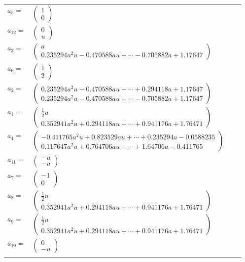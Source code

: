 \documentclass[1p]{elsarticle_modified}
\theoremstyle{definition}
\begin{document}
\begin{tabular}{m{7pt} m{180pt} m{7pt} m{180pt} }
\flushright $a_{5}=$&$\begin{pmatrix}1\\0\end{pmatrix}$ \\
\flushright $a_{12}=$&$\begin{pmatrix}0\\u\end{pmatrix}$ \\
\flushright $a_{3}=$&$\begin{pmatrix}a\\0.235294 a^{2} u-0.470588 a u+\cdots-0.705882 a+1.17647\end{pmatrix}$ \\
\flushright $a_{6}=$&$\begin{pmatrix}1\\2\end{pmatrix}$ \\
\flushright $a_{2}=$&$\begin{pmatrix}0.235294 a^{2} u-0.470588 a u+\cdots+0.294118 a+1.17647\\0.235294 a^{2} u-0.470588 a u+\cdots-0.705882 a+1.17647\end{pmatrix}$ \\
\flushright $a_{1}=$&$\begin{pmatrix}\frac{1}{2} u\\0.352941 a^{2} u+0.294118 a u+\cdots+0.941176 a+1.76471\end{pmatrix}$ \\
\flushright $a_{4}=$&$\begin{pmatrix}-0.411765 a^{2} u+0.823529 a u+\cdots+0.235294 a-0.0588235\\0.117647 a^{2} u+0.764706 a u+\cdots+1.64706 a-0.411765\end{pmatrix}$ \\
\flushright $a_{11}=$&$\begin{pmatrix}- u\\- u\end{pmatrix}$ \\
\flushright $a_{7}=$&$\begin{pmatrix}-1\\0\end{pmatrix}$ \\
\flushright $a_{8}=$&$\begin{pmatrix}\frac{1}{2} u\\0.352941 a^{2} u+0.294118 a u+\cdots+0.941176 a+1.76471\end{pmatrix}$ \\
\flushright $a_{9}=$&$\begin{pmatrix}\frac{1}{2} u\\0.352941 a^{2} u+0.294118 a u+\cdots+0.941176 a+1.76471\end{pmatrix}$ \\
\flushright $a_{10}=$&$\begin{pmatrix}0\\- u\end{pmatrix}$\\&\end{tabular}
\end{document}
